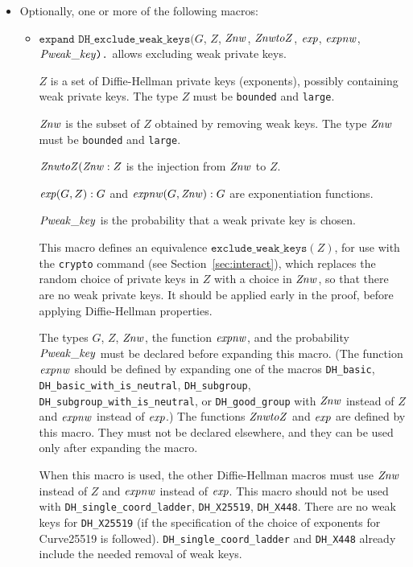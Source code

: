 \documentclass{article}
\begin{document}
\begin{itemize}
\begin{itemize}
   \item Optionally, one or more of the following macros:
     \begin{itemize}
     \item $\texttt{expand\ DH\_exclude\_weak\_keys(}G$, $Z$, $\mathit{Znw}$, $\mathit{ZnwtoZ}$, $\mathit{exp}$, $\mathit{expnw}$, $\mathit{Pweak\_key}\texttt{).}$ allows excluding weak private keys.

       $Z$ is a set of Diffie-Hellman private keys (exponents), possibly containing weak private keys. The type $Z$ must be \texttt{bounded} and \texttt{large}.
       
       $\mathit{Znw}$ is the subset of $Z$ obtained by removing weak keys. The type $\mathit{Znw}$ must be \texttt{bounded} and \texttt{large}.

       $\mathit{ZnwtoZ}(\mathit{Znw}:Z$ is the injection from $\mathit{Znw}$ to $Z$.

       $\mathit{exp}(G,Z):G$ and $\mathit{expnw}(G,\mathit{Znw}):G$ are exponentiation functions.
       
       $\mathit{Pweak\_key}$ is the probability that a weak private key is chosen.

       This macro defines an equivalence $\texttt{exclude\_weak\_keys}(Z)$,
       for use with the \texttt{crypto} command (see Section~\ref{sec:interact}), which replaces the random choice
       of private keys in $Z$ with a choice in $\mathit{Znw}$, so that there are no weak private keys.
       It should be applied early in the proof, before applying Diffie-Hellman properties.

       The types $G$, $Z$, $\mathit{Znw}$, the function $\mathit{expnw}$, and the probability $\mathit{Pweak\_key}$
       must be declared before expanding this macro. (The function $\mathit{expnw}$
       should be defined by expanding one of the macros \texttt{DH\_basic},
       \texttt{DH\_basic\_with\_is\_neutral},
       \texttt{DH\_subgroup}, 
       \texttt{DH\_subgroup\_with\_is\_neutral}, or \texttt{DH\_good\_group} with $\mathit{Znw}$ instead of $Z$ and $\mathit{expnw}$ instead of $\mathit{exp}$.) The
       functions $\mathit{ZnwtoZ}$ and $\mathit{exp}$ are defined by this macro. They must not be
       declared elsewhere, and they can be used only after expanding the
       macro.

       When this macro is used, the other Diffie-Hellman macros must use $\mathit{Znw}$ instead of $Z$
       and $\mathit{expnw}$ instead of $\mathit{exp}$.
       This macro should not be used with \texttt{DH\_single\_coord\_ladder},
       \texttt{DH\_X25519}, \texttt{DH\_X448}. There are no weak keys for \texttt{DH\_X25519} (if the specification of the choice of exponents for Curve25519 is followed). \texttt{DH\_single\_coord\_ladder} and \texttt{DH\_X448} already include the needed removal of weak keys.


\end{itemize}
\end{itemize}
\end{itemize}
\end{document}
